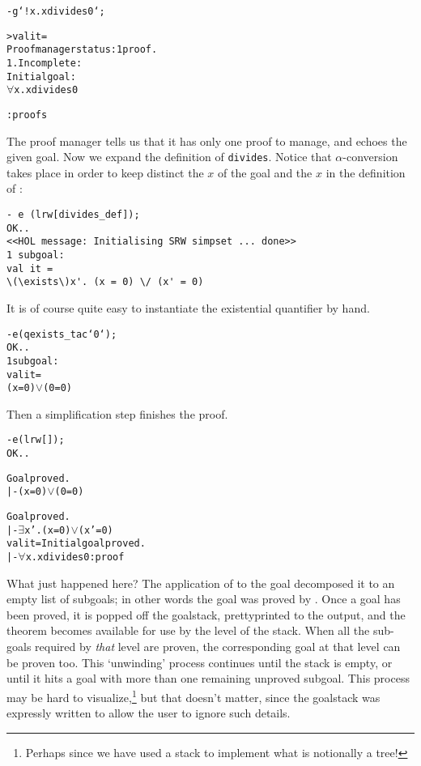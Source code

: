 \begin{session}
\begin{alltt}
- g `!x. x divides 0`;

> val it =
    Proof manager status: 1 proof.
    1. Incomplete:
         Initial goal:
         \(\forall\)x. x divides 0

     : proofs
\end{alltt}
\end{session}
The proof manager tells us that it has only one proof to manage, and
echoes the given goal.  Now we expand the definition of
\verb+divides+. Notice that $\alpha$-conversion takes place in order to
keep distinct the $x$ of the goal and the $x$ in the definition of
:
\begin{session}
\begin{verbatim}
- e (lrw[divides_def]);
OK..
<<HOL message: Initialising SRW simpset ... done>>
1 subgoal:
val it =
\(\exists\)x'. (x = 0) \/ (x' = 0)
\end{verbatim}
\end{session}
It is of course quite easy to instantiate the existential quantifier by
hand.
\begin{session}
\begin{alltt}
- e (qexists_tac `0`);
OK..
1 subgoal:
val it =
(x = 0) \(\lor\) (0 = 0)
\end{alltt}
\end{session}
Then a simplification step finishes the proof.
\begin{session}
\begin{alltt}
- e (lrw[]);
OK..

Goal proved.
|- (x = 0) \(\lor\) (0 = 0)

Goal proved.
|- \(\exists\)x'. (x = 0) \(\lor\) (x' = 0)
val it = Initial goal proved.
|- \(\forall\)x. x divides 0: proof
\end{alltt}
\end{session}

What just happened here? The application of  to the goal decomposed it to an empty list of subgoals; in other words the goal was proved by .
Once a goal has been proved, it is popped off the goalstack, prettyprinted to the output, and the theorem becomes available for use by the level of the stack. When all the sub-goals required by \textit{that} level are proven, the corresponding goal at that level can be proven too.  This `unwinding' process continues until the stack is empty, or until it hits a goal with more than one remaining unproved subgoal.
This process may be hard to visualize,\footnote{Perhaps since we have used a stack to implement what is notionally a tree!} but that doesn't matter, since the goalstack was expressly written to allow the user to ignore such details.

